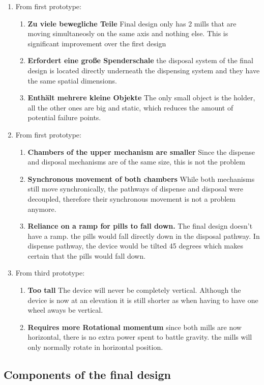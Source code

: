 \begin{enumerate}
	\item{From first prototype:}
	\begin{enumerate}
		\item{\textbf{Zu viele bewegliche Teile}} Final design only has 2 mills that are moving simultaneosly on the same axis and nothing else. This is significant improvement over the first design
		\item{\textbf{Erfordert eine große Spenderschale}} the disposal system of the final design is located directly underneath the dispensing system and they have the same spatial dimensions.
		\item{\textbf{Enthält mehrere kleine Objekte}} The only small object is the holder, all the other ones are big and static, which reduces the amount of potential failure points.
	\end{enumerate}
	\item{From first prototype:}
	\begin{enumerate}
		\item{\textbf{Chambers of the upper mechanism are smaller}} Since the dispense and disposal mechanisms are of the same size, this is not the problem
		\item{\textbf{Synchronous movement of both chambers}} While both mechanisms still move synchronically, the pathways of dispense and disposal were decoupled, therefore their synchronous movement is not a problem anymore.
		\item{\textbf{Reliance on a ramp for pills to fall down.}} The final design doesn't have a ramp. the pills would fall directly down in the disposal pathway. In dispense pathway, the device would be tilted 45 degrees which makes certain that the pills would fall down.
	\end{enumerate}
	\item{From third prototype:}
	\begin{enumerate}
		\item{\textbf{Too tall}} The device will never be completely vertical. Although the device is now at an elevation it is still shorter as when having to have one wheel aways be vertical.
		\item{\textbf{Requires more Rotational momentum}} since both mills are now horizontal, there is no extra power spent to battle gravity. the mills will only normally rotate in horizontal position.
	\end{enumerate}
\end{enumerate}
\newpage
\subsection{Components of the final design}
